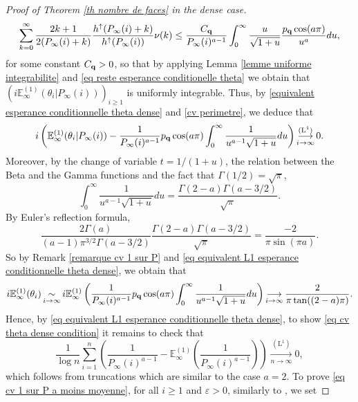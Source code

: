 \documentclass[11pt]{article}
\numberwithin{equation}{section}
\def\vp{\varepsilon}
\def\E{\mathbb{E}}
\begin{document}
\begin{proof}[Proof of Theorem \ref{th nombre de faces} in the dense case]
\begin{equation}\label{eq majoration esperance conditionnelle theta dense}
\sum_{k=0}^\infty
\frac{2k+1}{2(P_\infty(i)+k)} \frac{h^\uparrow(P_\infty(i)+k)}{h^\uparrow(P_\infty(i))} \nu(k)
\le 
\frac{C_{\bf q}}{P_\infty(i)^{a-1}} \int_{0}^\infty \frac{u}{\sqrt{1+u}} \frac{p_{\bf q} \cos(a \pi)}{ u^a} du,
\end{equation}
for some constant $C_{\bf q}>0$, so that by applying Lemma \ref{lemme uniforme integrabilite} and \eqref{eq reste esperance conditionelle theta} we obtain that $(i \E^{(1)}_\infty(\theta_i \vert P_\infty(i)))_{i \ge 1}$ is uniformly integrable. 
Thus, by \eqref{equivalent esperance conditionnelle theta dense} and \eqref{cv perimetre}, we deduce that
\begin{equation}\label{eq equivalent L1 esperance conditionnelle theta dense}
i \left( \E^{(1)}_\infty(\theta_i \vert P_\infty(i)) -  \frac{1}{P_\infty(i)^{a-1}} p_{\bf q} \cos (a\pi)  \int_0^\infty \frac{1}{u^{a-1} \sqrt{1+ u}} du \right)
\mathop{\longrightarrow}\limits_{i\to \infty}^{(\mathrm{L}^1)} 0.
\end{equation}
Moreover, by the change of variable $t=1/(1+u)$, the relation between the Beta and the Gamma functions and the fact that $\Gamma(1/2)= \sqrt{\pi}$, 
$$
\int_0^\infty \frac{1}{u^{a-1} \sqrt{1+u}} du  = \frac{\Gamma(2-a) \Gamma(a-3/2)}{\sqrt{\pi}}.
$$
By Euler's reflection formula,
$$
\frac{2\Gamma(a)}{(a-1) \pi^{3/2} \Gamma(a-3/2)} 
\frac{\Gamma(2-a) \Gamma(a-3/2)}{\sqrt{\pi}} 
=\frac{-2}{\pi \sin(\pi a)}.
$$
So by Remark \ref{remarque cv 1 sur P} and \eqref{eq equivalent L1 esperance conditionnelle theta dense}, we obtain that
\begin{equation}\label{eq cv esp theta}
i\E^{(1)}_\infty(\theta_i)
\mathop{\sim}\limits_{i \to \infty}
i \E^{(1)}_\infty \left( \frac{1}{P_\infty(i)^{a-1}} p_{\bf q} \cos(a \pi) \int_0^\infty \frac{1}{u^{a-1} \sqrt{1+u}} du\right)
\mathop{\longrightarrow}_{i \to \infty}
\frac{2}{\pi \tan((2-a) \pi)}.
\end{equation}
Hence, by \eqref{eq equivalent L1 esperance conditionnelle theta dense}, to show \eqref{eq cv theta dense condition} it remains to check that
\begin{equation}\label{eq cv 1 sur P a moins moyenne}
	\frac{1}{\log n}\sum_{i=1}^n \left( \frac{1}{P_\infty(i)^{a-1}}
	-\E^{(1)}_\infty \left(\frac{1}{P_\infty(i)^{a-1}}\right)
	\right)
	\mathop{\longrightarrow}\limits_{n\to \infty}^{(\mathrm{L}^1)}
	0,
\end{equation}
which follows from truncations which are similar to the case $a=2$. To prove \eqref{eq cv 1 sur P a moins moyenne}, for all $i\ge 1$ and $\vp>0$, similarly to \cite{BCM}, we set

\end{proof}
\end{document}
